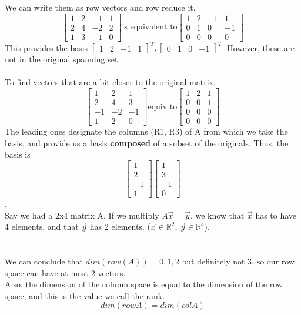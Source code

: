 \documentclass[twocolumn,10pt]{article}
\begin{document}
We can write them as row vectors and row reduce it.
$$\begin{bmatrix}1 & 2 & -1 & 1 \\ 2 & 4 & -2 & 2 \\ 1 & 3 & -1 & 0 \end{bmatrix}\text{is equivalent to} \begin{bmatrix}1 & 2 & -1 & 1 \\ 0 & 1 & 0 & -1 \\ 0 & 0 & 0 & 0 \end{bmatrix}$$
This provides the basis $\begin{bmatrix}1 & 2 & -1 & 1\end{bmatrix}^T, \begin{bmatrix}0 & 1 & 0 & -1 \end{bmatrix}^T$. However, these are not in the original spanning set. \\\\To find vectors that are a bit closer to the original matrix.\\
$$\begin{bmatrix}1 & 2 & 1 \\ 2 & 4 & 3 \\-1 & -2 & -1 \\ 1 & 2 & 0 \end{bmatrix} \text{equiv to}\begin{bmatrix}1 & 2 & 1 \\ 0 & 0 & 1 \\0 & 0 & 0 \\ 0 & 0 & 0 \end{bmatrix} $$ The leading ones designate the columns (R1, R3) of A from which we take the basis, and provide us a basis \textbf{composed} of a subset of the originals. Thus, the basis is $$\begin{bmatrix}1 \\ 2 \\ -1 \\ 1\end{bmatrix} \begin{bmatrix}1 \\ 3 \\-1 \\0 \end{bmatrix}$$.\\
Say we had a 2x4 matrix A. If we multiply $A\vec{x} = \vec{y}$, we know that $\vec{x}$ has to have 4 elements, and that $\vec{y}$ has 2 elements. ($\vec{x}\in\mathbb{R}^2$, $\vec{y} \in\mathbb{R}^4$). \\\\ \\We can conclude that $dim(row(A)) = 0,1,2$ but definitely not 3, so our row space can have at most 2 vectors. \\ Also, the dimension of the column space is equal to the dimension of the row space, and this is the value we call the rank. $$dim(row A) = dim(col A)$$ \\\\
\end{document}
